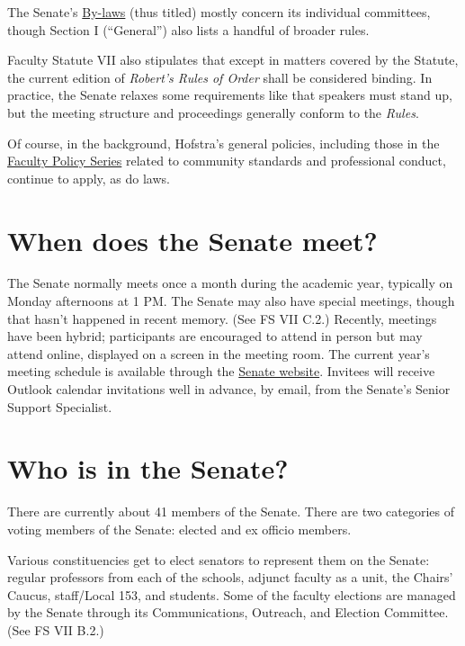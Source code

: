 \documentclass[12pt]{article}
\begin{document}
The Senate's
\href{https://www.hofstra.edu/sites/default/files/2022-04/senatebylaws.pdf}{By-laws}
(thus titled) mostly concern its individual committees, though Section I
(``General'') also lists a handful of broader rules.

Faculty Statute VII also stipulates that except in matters covered by
the Statute, the current edition of \emph{Robert's Rules of Order} shall
be considered binding. In practice, the Senate relaxes some requirements
like that speakers must stand up, but the meeting structure and
proceedings generally conform to the \emph{Rules}.

Of course, in the background, Hofstra's general policies, including
those in the
\href{https://www.hofstra.edu/senate/faculty-policy-series.html}{Faculty
Policy Series} related to community standards and professional conduct,
continue to apply, as do laws.

\section{When does the Senate meet?}\label{when-does-the-senate-meet}

The Senate normally meets once a month during the academic year,
typically on Monday afternoons at 1 PM. The Senate may also have special
meetings, though that hasn't happened in recent memory. (See FS VII
C.2.) Recently, meetings have been hybrid; participants are encouraged
to attend in person but may attend online, displayed on a screen in the
meeting room. The current year's meeting schedule is available through
the \href{https://www.hofstra.edu/senate/}{Senate website}. Invitees
will receive Outlook calendar invitations well in advance, by email,
from the Senate's Senior Support Specialist.

\section{Who is in the Senate?}\label{who-is-in-the-senate}

There are currently about 41 members of the Senate. There are two
categories of voting members of the Senate: elected and ex officio
members.

Various constituencies get to elect senators to represent them on the
Senate: regular professors from each of the schools, adjunct faculty as
a unit, the Chairs' Caucus, staff/Local 153, and students. Some of the
faculty elections are managed by the Senate through its Communications,
Outreach, and Election Committee. (See FS VII B.2.)
\end{document}
